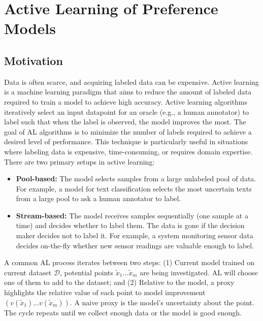 \documentclass[
  letterpaper,
  numbers=noenddot,
  DIV=11]{scrreprt}
\let\oldchapter\chapter
\def\chapter{%
  \setcounter{sidenote}{1}%
  \oldchapter
}
\theoremstyle{definition}
\theoremstyle{plain}
\theoremstyle{plain}
\theoremstyle{remark}
\begin{document}

\chapter{Active Learning of Preference
Models}\label{active-learning-of-preference-models}

\section{Motivation}\label{motivation}

Data is often scarce, and acquiring labeled data can be expensive.
Active learning is a machine learning paradigm that aims to reduce the
amount of labeled data required to train a model to achieve high
accuracy. Active learning algorithms iteratively select an input
datapoint for an oracle (e.g., a human annotator) to label such that
when the label is observed, the model improves the most. The goal of AL
algorithms is to minimize the number of labels required to achieve a
desired level of performance. This technique is particularly useful in
situations where labeling data is expensive, time-consuming, or requires
domain expertise. There are two primary setups in active learning:

\begin{itemize}
\item
  \textbf{Pool-based:} The model selects samples from a large unlabeled
  pool of data. For example, a model for text classification selects the
  most uncertain texts from a large pool to ask a human annotator to
  label.
\item
  \textbf{Stream-based:} The model receives samples sequentially (one
  sample at a time) and decides whether to label them. The data is gone
  if the decision maker decides not to label it. For example, a system
  monitoring sensor data decides on-the-fly whether new sensor readings
  are valuable enough to label.
\end{itemize}

A common AL process iterates between two steps: (1) Current model
trained on current dataset \(\mathcal{D}\), potential points
\(\tilde{x}_1 \dots \tilde{x}_m\) are being investigated. AL will choose
one of them to add to the dataset; and (2) Relative to the model, a
proxy highlights the relative value of each point to model improvement
\((v(\tilde{x}_1) \dots v(\tilde{x}_m) )\). A naive proxy is the model's
uncertainty about the point. The cycle repeats until we collect enough
data or the model is good enough.
\end{document}
